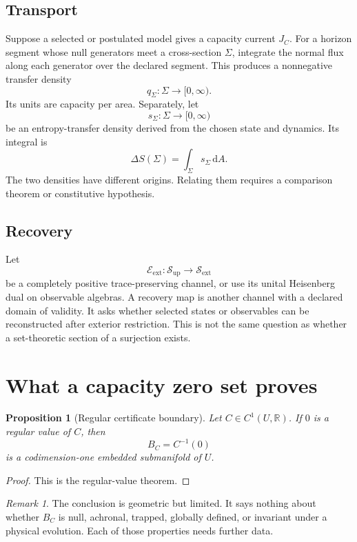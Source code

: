 \documentclass[11pt,a4paper]{article}
\numberwithin{equation}{section}
\newtheorem{proposition}[theorem]{Proposition}
\theoremstyle{definition}
\theoremstyle{remark}
\newtheorem{remark}[theorem]{Remark}
\newcommand{\dd}{\mathrm{d}}
\newcommand{\cE}{\mathcal E}
\newcommand{\cS}{\mathcal S}
\newcommand{\bbR}{\mathbb R}
\begin{document}
\subsection{Transport}

Suppose a selected or postulated model gives a capacity current \(J_C\).
For a horizon segment whose null generators meet a cross-section
\(\Sigma\), integrate the normal flux along each generator over the
declared segment.  This produces a nonnegative transfer density
\[
  q_\Sigma:\Sigma\longrightarrow[0,\infty).
\]
Its units are capacity per area.  Separately, let
\[
  s_\Sigma:\Sigma\longrightarrow[0,\infty)
\]
be an entropy-transfer density derived from the chosen state and
dynamics.  Its integral is
\[
  \Delta S(\Sigma)=\int_\Sigma s_\Sigma\,\dd A.
\]
The two densities have different origins.  Relating them requires a
comparison theorem or constitutive hypothesis.

\subsection{Recovery}

Let
\[
  \cE_{\mathrm{ext}}:\cS_{\mathrm{up}}\longrightarrow
  \cS_{\mathrm{ext}}
\]
be a completely positive trace-preserving channel, or use its unital
Heisenberg dual on observable algebras.  A recovery map is another
channel with a declared domain of validity.  It asks whether selected
states or observables can be reconstructed after exterior restriction.
This is not the same question as whether a set-theoretic section of a
surjection exists.

\section{What a capacity zero set proves}

\begin{proposition}[Regular certificate boundary]
\label{prop:regular}
Let \(C\in C^1(U,\bbR)\).  If \(0\) is a regular value of \(C\), then
\[
  B_C=C^{-1}(0)
\]
is a codimension-one embedded submanifold of \(U\).
\end{proposition}

\begin{proof}
This is the regular-value theorem.
\end{proof}

\begin{remark}
The conclusion is geometric but limited.  It says nothing about whether
\(B_C\) is null, achronal, trapped, globally defined, or invariant under a
physical evolution.  Each of those properties needs further data.
\end{remark}
\end{document}
